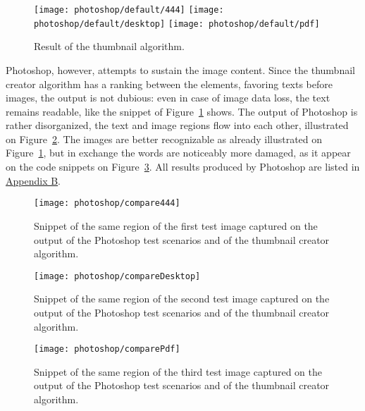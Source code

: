 \documentclass[draft,final]{vutinfth} %
\begin{document}
	\begin{figure}[H]
		\texttt{[image: photoshop/default/444]}\hfill
		\texttt{[image: photoshop/default/desktop]}\hfill
		\texttt{[image: photoshop/default/pdf]}
		\caption{Result of the thumbnail algorithm.}
	\end{figure}
	Photoshop, however, attempts to sustain the image content.
	Since the thumbnail creator algorithm has a ranking between the elements, favoring texts before images, the output is not dubious: even in case of image data loss, the text remains readable, like the snippet of Figure~\ref{fig:comp444} shows.
	The output of Photoshop is rather disorganized, the text and image regions flow into each other, illustrated on Figure~\ref{fig:compDesktop}.
	The images are better recognizable as already illustrated on Figure~\ref{fig:comp444}, but in exchange the words are noticeably more damaged, as it appear on the code snippets on Figure~\ref{fig:comppdf}. 
	All results produced by Photoshop are listed in \hyperref[AppB]{Appendix B}. 
	
	\begin{figure}[H]
		\centering		
		\texttt{[image: photoshop/compare444]}
		\caption{Snippet of the same region of the first test image captured on the output of the Photoshop test scenarios and of the thumbnail creator algorithm. }
		\label{fig:comp444}
	\end{figure}
	\begin{figure}[H]
		\centering		
		\texttt{[image: photoshop/compareDesktop]}
		\caption{Snippet of the same region of the second test image captured on the output of the Photoshop test scenarios and of the thumbnail creator algorithm.}
		\label{fig:compDesktop}
	\end{figure}
	\begin{figure}[H]
		\centering		
		\texttt{[image: photoshop/comparePdf]}
		\caption{Snippet of the same region of the third test image captured on the output of the Photoshop test scenarios and of the thumbnail creator algorithm.}
		\label{fig:comppdf}
	\end{figure}
	
\end{document}
